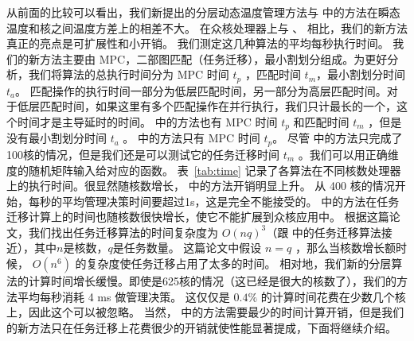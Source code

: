 从前面的比较可以看出，我们新提出的分层动态温度管理方法与 \cite{MaWang:APCCAS'14}中的方法在瞬态温度和核之间温度方差上的相差不大。
 在众核处理器上与 \cite{MaWang:APCCAS'14}、 \cite{Hanumaiah:TCAD'11}相比，我们的新方法真正的亮点是可扩展性和小开销。
 我们测定这几种算法的平均每秒执行时间。
 我们的新方法主要由 MPC，二部图匹配（任务迁移），最小割划分组成。为更好分析，我们将算法的总执行时间分为 MPC 时间 $t_p$ ，匹配时间 $t_m$，最小割划分时间 $t_a$。
 匹配操作的执行时间一部分为低层匹配时间，另一部分为高层匹配时间。对于低层匹配时间，如果这里有多个匹配操作在并行执行，我们只计最长的一个，这个时间才是主导延时的时间。
 \cite{MaWang:APCCAS'14} 中的方法也有 MPC 时间 $t_p$ 和匹配时间 $t_m$ ，但是没有最小割划分时间 $t_a$ 。
\cite{Zanini:ECCTD'09} 中的方法只有 MPC 时间 $t_p$。
 尽管 \cite{Hanumaiah:TCAD'11} 中的方法只完成了100核的情况，但是我们还是可以测试它的任务迁移时间 $t_m$ 。我们可以用正确维度的随机矩阵输入给对应的函数。
 表~\ref{tab:time} 记录了各算法在不同核数处理器上的执行时间。很显然随核数增长， \cite{MaWang:APCCAS'14} 中的方法开销明显上升。
 从 400 核的情况开始，每秒的平均管理决策时间要超过1s，这是完全不能接受的。
 \cite{Hanumaiah:TCAD'11} 中的方法在任务迁移计算上的时间也随核数很快增长，使它不能扩展到众核应用中。
 根据这篇论文，我们找出任务迁移算法的时间复杂度为 $O(nq)^3$（跟 \cite{MaWang:APCCAS'14} 中的任务迁移算法接近），其中$n$是核数，$q$是任务数量。
 这篇论文中假设 $n=q$ ，那么当核数增长额时候， $O(n^6)$ 的复杂度使任务迁移占用了太多的时间。
 相对地，我们新的分层算法的计算时间增长缓慢。即使是625核的情况（这已经是很大的核数了），我们的方法平均每秒消耗 4 ms 做管理决策。
 这仅仅是 $0.4\%$ 的计算时间花费在少数几个核上，因此这个可以被忽略。
 当然，\cite{Zanini:ECCTD'09} 中的方法需要最少的时间计算开销，但是我们的新方法只在任务迁移上花费很少的开销就使性能显著提成，下面将继续介绍。
